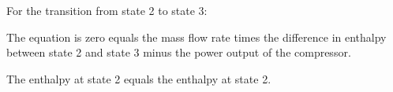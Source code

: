 For the transition from state 2 to state 3:

The equation is zero equals the mass flow rate times the difference in enthalpy between state 2 and state 3 minus the power output of the compressor.

The enthalpy at state 2 equals the enthalpy at state 2.